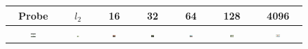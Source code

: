 \begin{figure}[t]
    \begin{center}
        \begin{tabular}{|c|c|ccccc|}
           \hline
            Probe & $l_2$ & 16 & 32 & 64 & 128 & 4096  \\ \hline \hline
           \includegraphics[width=0.1\textwidth]{images/ret_results/diving/probe.png} & \includegraphics[width=0.1\textwidth]{images/ret_results/diving/l2.png} & 
           \includegraphics[width=0.1\textwidth]{images/ret_results/diving/16.png} & 
           \includegraphics[width=0.1\textwidth]{images/ret_results/diving/32.png} & 
           \includegraphics[width=0.1\textwidth]{images/ret_results/diving/64.png} & 
           \includegraphics[width=0.1\textwidth]{images/ret_results/diving/128.png} & 
           \includegraphics[width=0.1\textwidth]{images/ret_results/diving/4096.png} \\

\end{tabular}
\end{center}
\end{figure}
